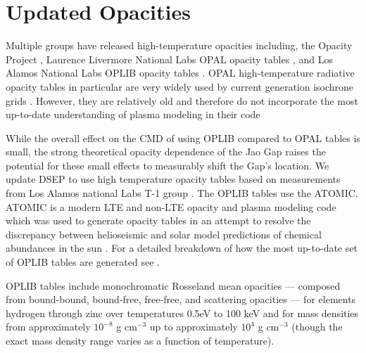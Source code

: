 \section{Updated Opacities}\label{sec:opac}
Multiple groups have released high-temperature opacities including, the Opacity
Project \citep[OP][]{Seaton1994}, Laurence Livermore National Labs OPAL opacity
tables \citep{Iglesias1996}, and Los Alamos National Labs OPLIB opacity tables
\citep{Colgan2016}. OPAL high-temperature radiative opacity tables in
particular are very widely used by current generation isochrone grids
\citep[e.g. Dartmouth, MIST, \& StarEvol, ][]{Dotter2008,Choi2016,Amard2019}.
However, they are relatively old and therefore do not incorporate the most
up-to-date understanding of plasma modeling in their code \citep{Colgan2016}

While the overall effect on the CMD of using OPLIB compared to OPAL
tables is small, the strong theoretical opacity dependence of the Jao Gap
raises the potential for these small effects to measurably shift the Gap's
location. We update DSEP to use high temperature opacity tables based on
measurements from Los Alamos national Labs T-1 group
\citep[OPLIB,][]{Colgan2016}. The OPLIB tables use the ATOMIC. ATOMIC
\citep{Magee2004,Hakel2006,Fontes2016} is a modern LTE and non-LTE opacity and
plasma modeling code which was used to generate opacity tables in an attempt to
resolve the discrepancy between helioseismic and solar model predictions of
chemical abundances in the sun \citep{Bahcall2005}. For a detailed breakdown of
how the most up-to-date set of OPLIB tables are generated see
\citep{Colgan2013a, Colgan2013b, Colgan2015, Colgan2016}.

OPLIB tables include monochromatic Rosseland mean opacities --- composed from
bound-bound, bound-free, free-free, and scattering opacities --- for elements
hydrogen through zinc over temperatures 0.5eV to 100 keV and for mass densities
from approximately $10^{-8}$ g cm$^{-3}$ up to approximately $10^{4}$ g
cm$^{-3}$ (though the exact mass density range varies as a function of
temperature). 

